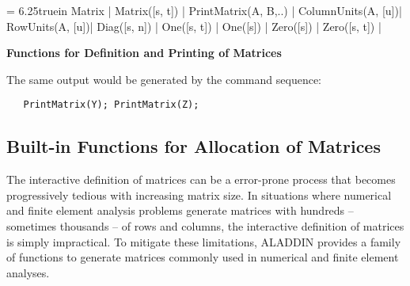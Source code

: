 \begin{table}[t]
\tablewidth = 6.25truein
\begintable
Matrix           |                                   \crthick
Matrix([s, t])   |                          \cr
PrintMatrix(A, B,..) |       \crthick
ColumnUnits(A, [u])|                     \cr
RowUnits(A, [u])|                        \crthick
Diag([s, n])     |  \cr
One([s, t])      |             \cr
One([s])         |             \cr
Zero([s])        |            \cr
Zero([s, t])     |           
\endtable
\vspace{0.01 in}
\caption{\bf Functions for Definition and Printing of Matrices}
\label{tab: my-builtin-matrix-allocation-functions}
\end{table}

\vspace{0.15 in}\noindent
The same output would be generated by the command sequence:

\begin{footnotesize}
\begin{verbatim}
   PrintMatrix(Y); PrintMatrix(Z);
\end{verbatim}
\end{footnotesize}

\subsection{Built-in Functions for Allocation of Matrices}

\vspace{0.15 in}
\noindent\hspace{0.50 in}
The interactive definition of matrices can be a error-prone process that
becomes progressively tedious with increasing matrix size.
In situations where numerical and finite element analysis problems generate
matrices with hundreds -- sometimes thousands -- of rows and columns,
the interactive definition of matrices is simply impractical.
To mitigate these limitations,
ALADDIN provides a family of functions to generate matrices
commonly used in numerical and finite element analyses.

